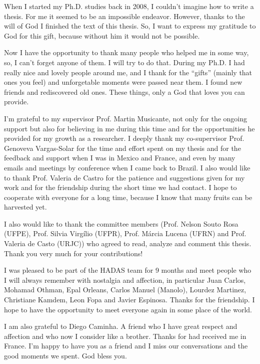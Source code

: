 	{
	  \fontsize{12}{14}
	  \selectfont

	When I started my Ph.D. studies back in 2008, I couldn't imagine how to 
	write a thesis. For me it seemed to be an impossible endeavor. However, thanks
	to the will of God I finished the text of this thesis. So, I want to express my
	gratitude to God for this gift, because without him it would not be possible.  
	
	 
	Now I have the opportunity to thank many people who helped me in some
	way, so, I can't forget anyone of them. I will try to do that. During my Ph.D.
	I had really nice and lovely people around me, and I thank for the ``gifts''
	(mainly that ones you feel) and unforgetable moments were passed near them. I
	found new friends and rediscovered old ones. These things, only a God that
	loves you can provide.    
	
	I'm grateful to my supervisor Prof. Martin Musicante, not only for the ongoing
	support but also for believing in me during this time and for the opportunities
	he provided for my growth as a researcher. I deeply thank my co-supervisor
	Prof. Genoveva Vargas-Solar for the time and effort spent on my thesis and for the feedback
	and support when I was in Mexico and France, and even by many emails and
	meetings by conference when I came back to Brazil. I also would like to thank
	Prof. Valeria de Castro for the patience and suggestions given for my
	work and for the friendship during the short time we had contact. I hope to
	cooperate with everyone for a long time, because I know that many fruits can be harvested yet.
	
	I also would like to thank the committee members (Prof. Nelson Souto Rosa
	(UFPE), Prof. Silvia Virg\'ilio (UFPR), Prof. M\'arcia Lucena (UFRN) and
	Prof. Valeria de Casto (URJC)) who agreed to read, analyze and comment this
	thesis. Thank you very much for your contributions!
	
	I was pleased to be part of the HADAS team for 9 months and meet people
	who I will always remember with nostalgia and affection, in particular Juan
	Carlos, Mohamad Othman, Epal Orleans, Carlos Manuel (Manolo), Lourdez
	Martinez, Christiane Kamdem, Leon Fopa and Javier Espinosa. Thanks for the
	friendship. I hope to have the opportunity to meet everyone again in some
	place of the world.
	
	I am also grateful to Diego Caminha. A friend who I have great respect
	and affection and who now I consider like a brother. Thanks for had received me
	in France. I'm happy to have you as a friend and I miss our conversations and
	the  good moments we spent. God bless you.  
	
}
